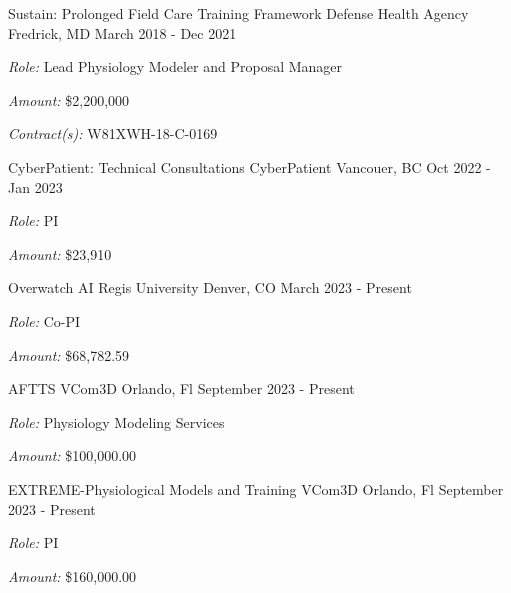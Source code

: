 \begin{cventries}
  \cventry
    {Sustain: Prolonged Field Care Training Framework} %
    {Defense Health Agency} %
    {Fredrick, MD} %
    {March 2018 - Dec 2021} %
     {
     \begin{cvitems}
     \item{\textit{Role:} Lead Physiology Modeler and Proposal Manager}
     \item{\textit{Amount:} \$2,200,000}
     \item{\textit{Contract(s):} W81XWH-18-C-0169}
     \end{cvitems}
     }

  \cventry
    {CyberPatient: Technical Consultations} %
    {CyberPatient} %
    {Vancouer, BC} %
    {Oct 2022 - Jan 2023} %
     {
     \begin{cvitems}
     \item{\textit{Role:} PI}
     \item{\textit{Amount:} \$23,910}
     \end{cvitems}
     }

  \cventry
    {Overwatch AI} %
    {Regis University} %
    {Denver, CO} %
    {March 2023 - Present} %
     {
     \begin{cvitems}
     \item{\textit{Role:} Co-PI}
     \item{\textit{Amount:} \$68,782.59}
     \end{cvitems}
     }

  \cventry
    {AFTTS} %
    {VCom3D} %
    {Orlando, Fl} %
    {September 2023 - Present} %
     {
     \begin{cvitems}
     \item{\textit{Role:} Physiology Modeling Services}
     \item{\textit{Amount:} \$100,000.00}
     \end{cvitems}
     }

  \cventry
    {EXTREME-Physiological Models and Training} %
    {VCom3D} %
    {Orlando, Fl} %
    {September 2023 - Present} %
     {
     \begin{cvitems}
     \item{\textit{Role:} PI}
     \item{\textit{Amount:} \$160,000.00}
     \end{cvitems}
     }


\end{cventries}
